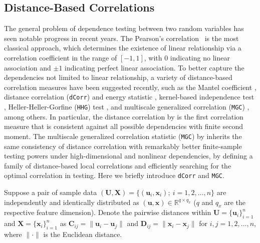 \documentclass[12pt]{article}
\theoremstyle{definition}
\begin{document}
	\subsection{Distance-Based Correlations}
	\label{ssec:method1}
	
	The general problem of dependence testing between two random variables has seen notable progress in recent years. The Pearson's correlation~\citep{Pearson1895} is the most classical approach, which determines the existence of linear relationship via a correlation coefficient in the range of $[-1,1]$, with $0$ indicating no linear association and $\pm 1$ indicating perfect linear association. To better capture the dependencies not limited to linear relationship, a variety of distance-based correlation measures have been suggested recently, such as the Mantel coefficient \citep{mantel1967}, distance correlation (\texttt{dCorr}) and energy statistic \citep{szekely2007measuring,szekelyRizzo2013a, RizzoSzekely2016}, kernel-based independence test \citep{GrettonGyorfi2010}, Heller-Heller-Gorfine (\texttt{HHG}) test \citep{HellerGorfine2013,heller2016consistent}, and multiscale generalized correlation (\texttt{MGC}) \citep{shen2016discovering}, among others. In particular, the distance correlation by \cite{szekely2007measuring} is the first correlation measure that is consistent against all possible dependencies with finite second moment. The multiscale generalized correlation statistic (\texttt{MGC}) by \cite{shen2016discovering} inherits the same consistency of distance correlation with remarkably better finite-sample testing powers under high-dimensional and nonlinear dependencies, by defining a family of distance-based local correlations and efficiently searching for the optimal correlation in testing. Here we briefly introduce \texttt{dCorr} and \texttt{MGC}.
	
	Suppose a pair of sample data $(\mathbf{U}, \mathbf{X}) = \{  (\mathbf{u}_{i}, \mathbf{x}_{i} );~i = 1,2, \ldots, n \}$ are independently and identically distributed as $(\mathbf{u},\mathbf{x}) \in \mathbb{R}^{q \times q_x}$ ($q$ and $q_x$ are the respective feature dimension). Denote the pairwise distances within $\mathbf{U}=\{\mathbf{u}_{i}\}_{i=1}^{n}$ and $\mathbf{X}=\{\mathbf{x}_{i}\}_{i=1}^{n}$ as $\mathbf{C}_{ij} = \| \mathbf{u}_{i} - \mathbf{u}_{j} \|$ and $\mathbf{D}_{ij} = \| \mathbf{x}_{i} - \mathbf{x}_{j} \|$ for $i,j=1,2, \ldots , n$, where $\| \cdot \|$ is the Euclidean distance.
	
\end{document}
